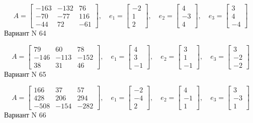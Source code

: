 \documentclass[11pt]{report}
\begin{document}
$$A = \left[\begin{matrix}-163 & -132 & 76\\-70 & -77 & 116\\-44 & 72 & -61\end{matrix}\right],\quad e_1 = \left[\begin{matrix}-2\\1\\2\end{matrix}\right],\quad e_2 = \left[\begin{matrix}4\\-3\\4\end{matrix}\right],\quad e_3 = \left[\begin{matrix}3\\4\\-4\end{matrix}\right]$$Вариант N 64

$$A = \left[\begin{matrix}79 & 60 & 78\\-146 & -113 & -152\\38 & 31 & 46\end{matrix}\right],\quad e_1 = \left[\begin{matrix}4\\3\\-1\end{matrix}\right],\quad e_2 = \left[\begin{matrix}3\\1\\-1\end{matrix}\right],\quad e_3 = \left[\begin{matrix}3\\-2\\-2\end{matrix}\right]$$Вариант N 65

$$A = \left[\begin{matrix}166 & 37 & 57\\428 & 206 & 294\\-508 & -154 & -282\end{matrix}\right],\quad e_1 = \left[\begin{matrix}-2\\-4\\2\end{matrix}\right],\quad e_2 = \left[\begin{matrix}4\\-1\\1\end{matrix}\right],\quad e_3 = \left[\begin{matrix}3\\-3\\1\end{matrix}\right]$$Вариант N 66
\end{document}
